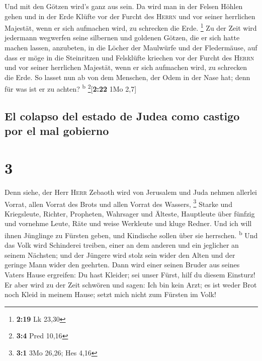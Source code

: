  Und mit den Götzen wird's ganz aus sein. 
Da wird man in der Felsen Höhlen gehen und in der Erde Klüfte vor der
Furcht des \textsc{Herrn} und vor seiner herrlichen Majestät, wenn er
sich aufmachen wird, zu schrecken die Erde. \footnote{\textbf{2:19} Lk
  23,30}  Zu der Zeit wird jedermann wegwerfen seine
silbernen und goldenen Götzen, die er sich hatte machen lassen,
anzubeten, in die Löcher der Maulwürfe und der Fledermäuse,
 auf dass er möge in die Steinritzen und Felsklüfte
kriechen vor der Furcht des \textsc{Herrn} und vor seiner herrlichen
Majestät, wenn er sich aufmachen wird, zu schrecken die Erde.
 So lasset nun ab von dem Menschen, der Odem in der Nase
hat; denn für was ist er zu achten? \textsuperscript{b}
\footnote{\textbf{3:4} Pred 10,16}{[}\textbf{2:22} 1Mo 2,7{]}

\hypertarget{el-colapso-del-estado-de-judea-como-castigo-por-el-mal-gobierno}{%
\subsection{El colapso del estado de Judea como castigo por el mal
gobierno}\label{el-colapso-del-estado-de-judea-como-castigo-por-el-mal-gobierno}}

\hypertarget{section-2}{%
\section{3}\label{section-2}}

 Denn siehe, der Herr \textsc{Herr} Zebaoth wird von
Jerusalem und Juda nehmen allerlei Vorrat, allen Vorrat des Brots und
allen Vorrat des Wassers, \footnote{\textbf{3:1} 3Mo 26,26; Hes 4,16}
 Starke und Kriegsleute, Richter, Propheten, Wahrsager und
Älteste,  Hauptleute über fünfzig und vornehme Leute, Räte
und weise Werkleute und kluge Redner.  Und ich will ihnen
Jünglinge zu Fürsten geben, und Kindische sollen über sie herrschen.
\textsuperscript{b}  Und das Volk wird Schinderei treiben,
einer an dem anderen und ein jeglicher an seinem Nächsten; und der
Jüngere wird stolz sein wider den Alten und der geringe Mann wider den
geehrten.  Dann wird einer seinen Bruder aus seines Vaters
Hause ergreifen: Du hast Kleider; sei unser Fürst, hilf du diesem
Einsturz!  Er aber wird zu der Zeit schwören und sagen:
Ich bin kein Arzt; es ist weder Brot noch Kleid in meinem Hause; setzt
mich nicht zum Fürsten im Volk!

